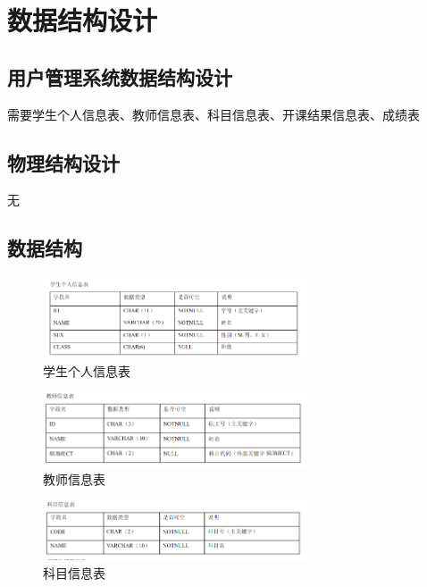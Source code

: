 \chapter{数据结构设计}
\section{用户管理系统数据结构设计}
需要学生个人信息表、教师信息表、科目信息表、开课结果信息表、成绩表

\section{物理结构设计}
无

\section{数据结构}
\begin{figure}[H] %
    \centering %
    \includegraphics[width=0.7\textwidth]{选区_006} %
    \caption{学生个人信息表} %
    \label{Fig.main2} %
\end{figure}

\begin{figure}[H] %
    \centering %
    \includegraphics[width=0.7\textwidth]{选区_007} %
    \caption{教师信息表} %
    \label{Fig.main2} %
\end{figure}

\begin{figure}[H] %
    \centering %
    \includegraphics[width=0.7\textwidth]{选区_008} %
    \caption{科目信息表} %
    \label{Fig.main2} %
\end{figure}

